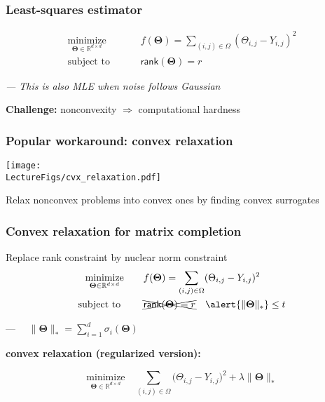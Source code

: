 \documentclass[compress,
mathserif,wide,%
]{beamer}
\begin{document}
\begin{frame}
  \frametitle{Least-squares estimator}
  \begin{align*}
    \underset{\bm{\Theta}\in \mathbb{R}^{d \times d}}{\text{minimize}} \qquad &f(\bm{\Theta})=  \sum_{(i,j)\in\Omega} ( \Theta_{i,j} - Y_{i,j} )^{2} \\
    \text{subject to } \qquad &\mathsf{rank}(\bm{\Theta}) = r
  \end{align*}

\pause
  {\hfill \footnotesize \em --- This is also MLE when noise follows Gaussian}

  \pause
  {
\vfill
\vspace{1em}

\begin{varblock}[\textwidth]{}
\centering
   {{\bf Challenge: }}  nonconvexity $\Longrightarrow$ computational hardness
\end{varblock}
}
\end{frame}




\begin{frame}
  \frametitle{Popular workaround: convex relaxation}
  
  
  \begin{center}
    \texttt{[image: \\LectureFigs/cvx\_relaxation.pdf]}
  \end{center}
  
  \vfill
  Relax nonconvex problems into convex ones by finding convex surrogates
  

\end{frame}

\begin{frame}
  \frametitle{Convex relaxation for matrix completion}
  Replace rank constraint by nuclear norm constraint
    \begin{align*}
    \underset{\bm{\Theta}\in \mathbb{R}^{d \times d}}{\text{minimize}} \qquad &f(\bm{\Theta})=  \sum_{(i,j)\in\Omega} ( \Theta_{i,j} - Y_{i,j} )^{2} \\
    \text{subject to } \qquad &\xcancel{\mathsf{rank}(\bm{\Theta}) = r} \quad \alert{\|\bm{\Theta}\|_{*}} \leq t
  \end{align*}

  {\hfill \footnotesize ---~~ $\|\bm{\Theta}\|_* = \sum_{i=1}^{d} \sigma_{i}(\bm{\Theta})$  }

\vfill

\pause
  {

\begin{varblock}[\textwidth]{}
\textbf{convex relaxation (regularized version):}
  \vspace{-2em}
\begin{center}
\[
   \underset{\bm{\Theta}\in\mathbb{R}^{d\times d}}{\text{minimize}}\quad  \sum_{(i,j)\in\Omega}\big(\Theta_{i,j}-Y_{i,j}\big)^{2}  +\lambda{\|\bm{\Theta}\|_{*}}
\]  
\end{center}
\end{varblock}
}
\end{frame}
\end{document}

